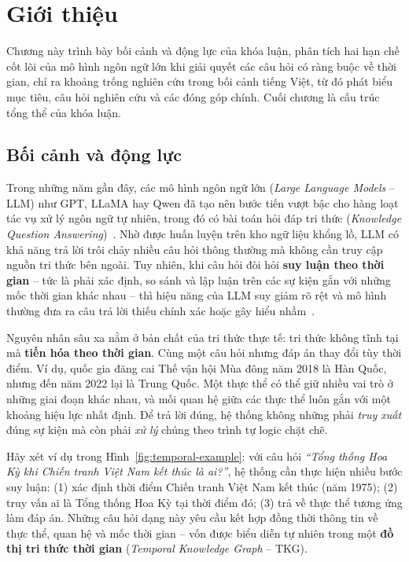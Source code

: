 \chapter{Giới thiệu}
\label{ch:intro}

Chương này trình bày bối cảnh và động lực của khóa luận, phân tích hai hạn chế cốt lõi của mô
hình ngôn ngữ lớn khi giải quyết các câu hỏi có ràng buộc về thời gian, chỉ ra khoảng trống
nghiên cứu trong bối cảnh tiếng Việt, từ đó phát biểu mục tiêu, câu hỏi nghiên cứu và các đóng
góp chính. Cuối chương là cấu trúc tổng thể của khóa luận.

\section{Bối cảnh và động lực}
\label{sec:motivation}

Trong những năm gần đây, các mô hình ngôn ngữ lớn (\textit{Large Language Models} -- LLM) như
GPT, LLaMA hay Qwen đã tạo nên bước tiến vượt bậc cho hàng loạt tác vụ xử lý ngôn ngữ tự nhiên,
trong đó có bài toán hỏi đáp tri thức (\textit{Knowledge Question Answering})~\cite{zhao2023llmsurvey}.
Nhờ được huấn luyện trên kho ngữ liệu khổng lồ, LLM có khả năng trả lời trôi chảy nhiều câu hỏi
thông thường mà không cần truy cập nguồn tri thức bên ngoài. Tuy nhiên, khi câu hỏi đòi hỏi
\textbf{suy luận theo thời gian} -- tức là phải xác định, so sánh và lập luận trên các sự kiện
gắn với những mốc thời gian khác nhau -- thì hiệu năng của LLM suy giảm rõ rệt và mô hình thường
đưa ra câu trả lời thiếu chính xác hoặc gây hiểu nhầm~\cite{chen2024ari}.

Nguyên nhân sâu xa nằm ở bản chất của tri thức thực tế: tri thức không tĩnh tại mà
\textbf{tiến hóa theo thời gian}. Cùng một câu hỏi nhưng đáp án thay đổi tùy thời điểm. Ví dụ,
quốc gia đăng cai Thế vận hội Mùa đông năm 2018 là Hàn Quốc, nhưng đến năm 2022 lại là Trung
Quốc. Một thực thể có thể giữ nhiều vai trò ở những giai đoạn khác nhau, và mối quan hệ giữa các
thực thể luôn gắn với một khoảng hiệu lực nhất định. Để trả lời đúng, hệ thống không những phải
\emph{truy xuất} đúng sự kiện mà còn phải \emph{xử lý} chúng theo trình tự logic chặt chẽ.

Hãy xét ví dụ trong Hình~\ref{fig:temporal-example}: với câu hỏi \textit{``Tổng thống Hoa Kỳ khi
Chiến tranh Việt Nam kết thúc là ai?''}, hệ thống cần thực hiện nhiều bước suy luận: (1) xác định
thời điểm Chiến tranh Việt Nam kết thúc (năm 1975); (2) truy vấn ai là Tổng thống Hoa Kỳ tại
thời điểm đó; (3) trả về thực thể tương ứng làm đáp án. Những câu hỏi dạng này yêu cầu kết hợp
đồng thời thông tin về thực thể, quan hệ và mốc thời gian -- vốn được biểu diễn tự nhiên trong
một \textbf{đồ thị tri thức thời gian} (\textit{Temporal Knowledge Graph} -- TKG).

